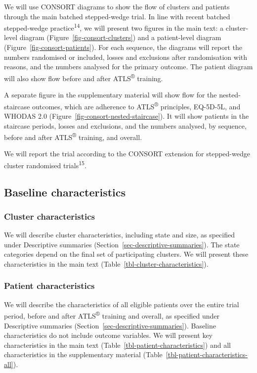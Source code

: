 \documentclass[
]{scrartcl}
\begin{document}
We will use CONSORT diagrams to show the flow of clusters and patients
through the main batched stepped-wedge trial. In line with recent
batched stepped-wedge practice\textsuperscript{14}, we will present two
figures in the main text: a cluster-level diagram
(Figure~\ref{fig-consort-clusters}) and a patient-level diagram
(Figure~\ref{fig-consort-patients}). For each sequence, the diagrams
will report the numbers randomised or included, losses and exclusions
after randomisation with reasons, and the numbers analysed for the
primary outcome. The patient diagram will also show flow before and
after ATLS\textsuperscript{®} training.

A separate figure in the supplementary material will show flow for the
nested-staircase outcomes, which are adherence to
ATLS\textsuperscript{®} principles, EQ-5D-5L, and WHODAS 2.0
(Figure~\ref{fig-consort-nested-staircase}). It will show patients in
the staircase periods, losses and exclusions, and the numbers analysed,
by sequence, before and after ATLS\textsuperscript{®} training, and
overall.

We will report the trial according to the CONSORT extension for
stepped-wedge cluster randomised trials\textsuperscript{15}.

\subsection{Baseline
characteristics}\label{sec-baseline-characteristics}

\subsubsection{Cluster
characteristics}\label{sec-cluster-characteristics}

We will describe cluster characteristics, including state and size, as
specified under Descriptive summaries
(Section~\ref{sec-descriptive-summaries}). The state categories depend
on the final set of participating clusters. We will present these
characteristics in the main text
(Table~\ref{tbl-cluster-characteristics}).

\subsubsection{Patient
characteristics}\label{sec-patient-characteristics}

We will describe the characteristics of all eligible patients over the
entire trial period, before and after ATLS\textsuperscript{®} training
and overall, as specified under Descriptive summaries
(Section~\ref{sec-descriptive-summaries}). Baseline characteristics do
not include outcome variables. We will present key characteristics in
the main text (Table~\ref{tbl-patient-characteristics}) and all
characteristics in the supplementary material
(Table~\ref{tbl-patient-characteristics-all}).
\end{document}
